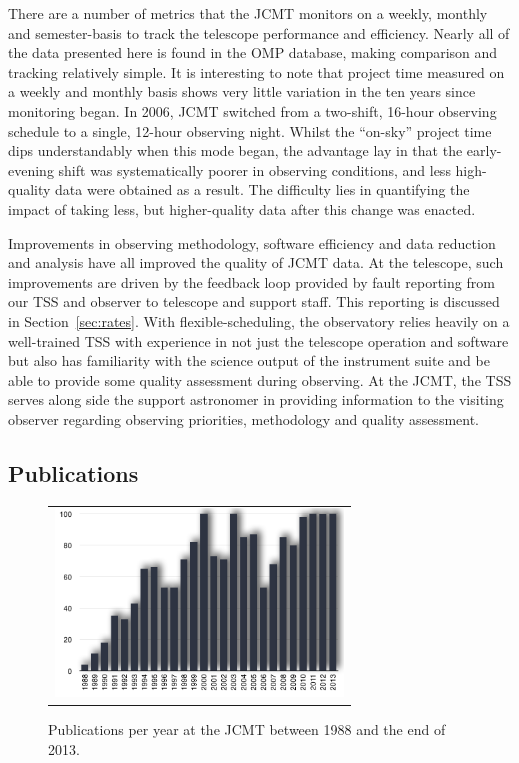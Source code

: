 \documentclass[]{spie}  %
\begin{document}
There are a number of metrics that the JCMT monitors on a weekly,
monthly and semester-basis to track the telescope performance and
efficiency. Nearly all of the data presented here is found in the OMP
database, making comparison and tracking relatively simple. It is
interesting to note that project time measured on a weekly and monthly
basis shows very little variation in the ten years since monitoring
began. In 2006, JCMT switched from a two-shift, 16-hour observing
schedule to a single, 12-hour observing night. Whilst the ``on-sky''
project time dips understandably when this mode began, the advantage
lay in that the early-evening shift was systematically poorer in
observing conditions, and less high-quality data were obtained as a
result. The difficulty lies in quantifying the impact of taking less,
but higher-quality data after this change was enacted.

Improvements in observing methodology, software efficiency and data
reduction and analysis have all improved the quality of JCMT data. At
the telescope, such improvements are driven by the feedback loop
provided by fault reporting from our TSS and observer to telescope and
support staff. This reporting is discussed in
Section~\ref{sec:rates}. With flexible-scheduling, the observatory
relies heavily on a well-trained TSS with experience in not just the
telescope operation and software but also has familiarity with the
science output of the instrument suite and be able to provide some
quality assessment during observing. At the JCMT, the TSS serves along
side the support astronomer in providing information to the visiting
observer regarding observing priorities, methodology and quality
assessment.

\subsection{Publications}

 \begin{figure}[t]
   \begin{center}
   \begin{tabular}{c}
   \includegraphics[height=5cm]{jcmt_publications}
   \end{tabular}
   \end{center}
   \caption{\label{fig:pub} Publications per year at the JCMT between 1988 and the end of 2013.}
\end{figure}
\end{document}
